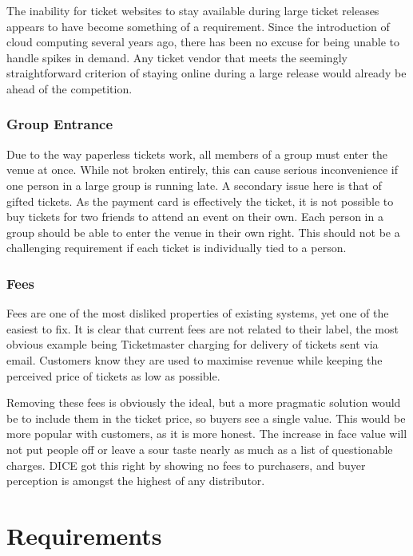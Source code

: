 \documentclass[12pt]{bhamdissertation}
\begin{document}
The inability for ticket websites to stay available during large ticket releases appears to have become something of a requirement. Since the introduction of cloud computing several years ago, there has been no excuse for being unable to handle spikes in demand. Any ticket vendor that meets the seemingly straightforward criterion of staying online during a large release would already be ahead of the competition.

\subsection{Group Entrance}

Due to the way paperless tickets work, all members of a group must enter the venue at once. While not broken entirely, this can cause serious inconvenience if one person in a large group is running late. A secondary issue here is that of gifted tickets. As the payment card is effectively the ticket, it is not possible to buy tickets for two friends to attend an event on their own. Each person in a group should be able to enter the venue in their own right. This should not be a challenging requirement if each ticket is individually tied to a person.

\subsection{Fees}

Fees are one of the most disliked properties of existing systems, yet one of the easiest to fix. It is clear that current fees are not related to their label, the most obvious example being Ticketmaster charging for delivery of tickets sent via email. Customers know they are used to maximise revenue while keeping the perceived price of tickets as low as possible.

Removing these fees is obviously the ideal, but a more pragmatic solution would be to include them in the ticket price, so buyers see a single value. This would be more popular with customers, as it is more honest. The increase in face value will not put people off or leave a sour taste nearly as much as a list of questionable charges. DICE got this right by showing no fees to purchasers, and buyer perception is amongst the highest of any distributor.

\chapter{Requirements}
\end{document}
